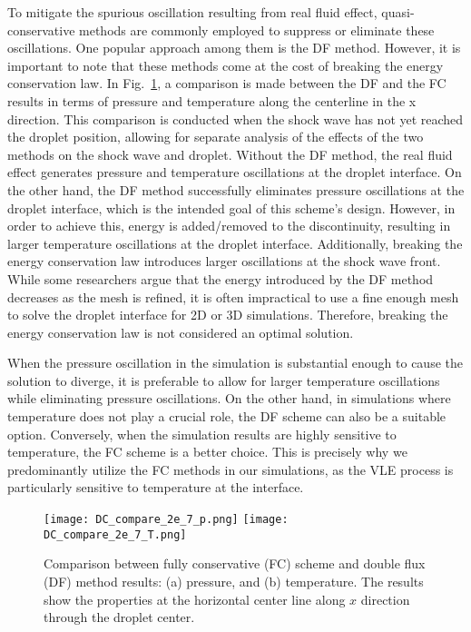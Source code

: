 To mitigate the spurious oscillation resulting from real fluid effect, quasi-conservative methods are commonly employed to suppress or eliminate these oscillations. One popular approach among them is the DF method. However, it is important to note that these methods come at the cost of breaking the energy conservation law. In Fig.~\ref{droplet_DC_compare}, a comparison is made between the DF and the FC results in terms of pressure and temperature along the centerline in the x direction. This comparison is conducted when the shock wave has not yet reached the droplet position, allowing for separate analysis of the effects of the two methods on the shock wave and droplet. Without the DF method, the real fluid effect generates pressure and temperature oscillations at the droplet interface. On the other hand, the DF method successfully eliminates pressure oscillations at the droplet interface, which is the intended goal of this scheme's design. However, in order to achieve this, energy is added/removed to the discontinuity, resulting in larger temperature oscillations at the droplet interface. Additionally, breaking the energy conservation law introduces larger oscillations at the shock wave front. While some researchers argue that the energy introduced by the DF method decreases as the mesh is refined, it is often impractical to use a fine enough mesh to solve the droplet interface for 2D or 3D simulations. Therefore, breaking the energy conservation law is not considered an optimal solution.

When the pressure oscillation in the simulation is substantial enough to cause the solution to diverge, it is preferable to allow for larger temperature oscillations while eliminating pressure oscillations. On the other hand, in simulations where temperature does not play a crucial role, the DF scheme can also be a suitable option. Conversely, when the simulation results are highly sensitive to temperature, the FC scheme is a better choice. This is precisely why we predominantly utilize the FC methods in our simulations, as the VLE process is particularly sensitive to temperature at the interface.



\begin{figure}[htbp]
	\centering
	\texttt{[image: DC\_compare\_2e\_7\_p.png]}
	\texttt{[image: DC\_compare\_2e\_7\_T.png]}
	\caption{Comparison between fully conservative (FC) scheme and double flux (DF) method results: (a) pressure, and (b) temperature. The results show the properties at the horizontal center line along $x$ direction through the droplet center.}
	\label{droplet_DC_compare}
\end{figure}

